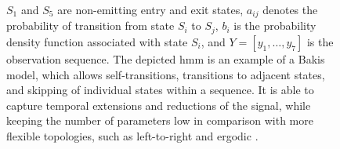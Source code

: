 \begin{figure}[!ht, margin=1cm]
  \label{figure:hmm}
  \begin{adjustwidth}{2cm}{2cm}
  \justify
  \small
  $S_{1}$ and $S_{5}$ are non-emitting entry and exit states, $a_{ij}$ denotes the probability of transition from state $S_{i}$ to $S_{j}$, $b_{i}$ is the probability density function associated with state $S_{i}$, and $Y=[y_{1}, \ldots, y_{7}]$ is the observation sequence. The depicted \gls{hmm} is an example of a Bakis model, which allows self-transitions, transitions to adjacent states, and skipping of individual states within a sequence. It is able to capture temporal extensions and reductions of the signal, while keeping the number of parameters low in comparison with more flexible topologies, such as left-to-right and ergodic \cite{fink2008markov}.
\end{adjustwidth}
  \end{figure}

